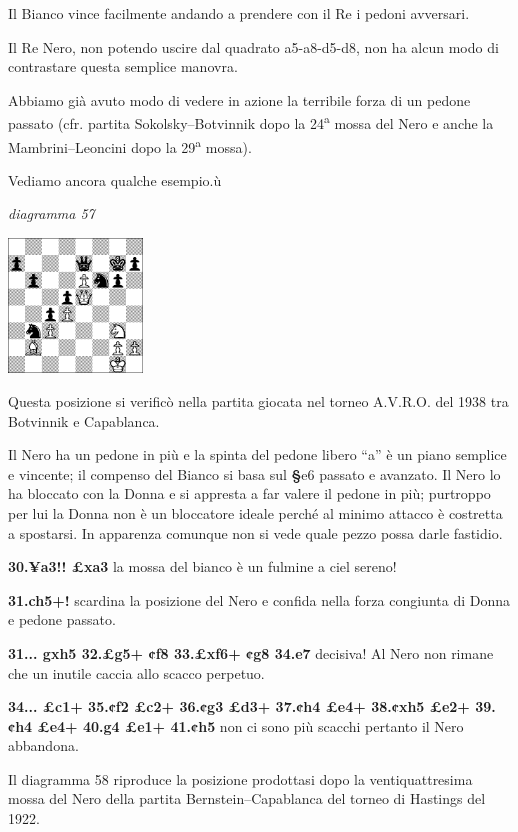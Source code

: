 \documentclass[
]{article}
\begin{document}
Il Bianco vince facilmente andando a prendere con il Re i pedoni
avversari.

Il Re Nero, non potendo uscire dal quadrato a5-a8-d5-d8, non ha alcun
modo di contrastare questa semplice manovra.

Abbiamo già avuto modo di vedere in azione la terribile forza di un
pedone passato (cfr. partita Sokolsky--Botvinnik dopo la
24\textsuperscript{a} mossa del Nero e anche la Mambrini--Leoncini dopo
la 29\textsuperscript{a} mossa).

Vediamo ancora qualche esempio.ù

\emph{diagramma 57}

\includegraphics[width=1.40972in,height=1.40972in]{vertopal_109f12be458a423d8f3cc838880eaea2/media/image57.png}

Questa posizione si verificò nella partita giocata nel torneo A.V.R.O.
del 1938 tra Botvinnik e Capablanca.

Il Nero ha un pedone in più e la spinta del pedone libero ``a'' è un
piano semplice e vincente; il compenso del Bianco si basa sul
\textbf{§}e6 passato e avanzato. Il Nero lo ha bloccato con la Donna e
si appresta a far valere il pedone in più; purtroppo per lui la Donna
non è un bloccatore ideale perché al minimo attacco è costretta a
spostarsi. In apparenza comunque non si vede quale pezzo possa darle
fastidio.

\textbf{30.¥a3!! £xa3} la mossa del bianco è un fulmine a ciel sereno!

\textbf{31.ch5+!} scardina la posizione del Nero e confida nella forza
congiunta di Donna e pedone passato.

\textbf{31... gxh5 32.£g5+ ¢f8 33.£xf6+ ¢g8 34.e7} decisiva! Al Nero non
rimane che un inutile caccia allo scacco perpetuo.

\textbf{34... £c1+ 35.¢f2 £c2+ 36.¢g3 £d3+ 37.¢h4 £e4+ 38.¢xh5 £e2+
39.¢h4 £e4+ 40.g4 £e1+ 41.¢h5} non ci sono più scacchi pertanto il Nero
abbandona.

Il diagramma 58 riproduce la posizione prodottasi dopo la
ventiquattresima mossa del Nero della partita Bernstein--Capablanca del
torneo di Hastings del 1922.
\end{document}
